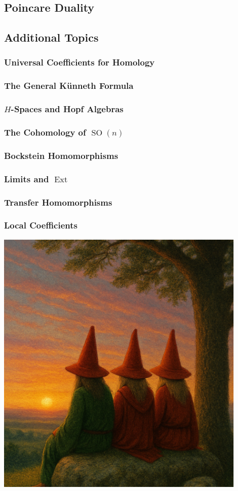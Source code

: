 \documentclass[11pt, a4paper, final]{amsart}
\DeclareMathOperator{\SO}{SO}
\DeclareMathOperator{\Ext}{Ext}
\numberwithin{theorem}{section}
\theoremstyle{definition}
\theoremstyle{remark}
\begin{document}
\subsection{Poincare Duality}
\subsection{Additional Topics}
\subsubsection{Universal Coefficients for Homology}
\subsubsection{The General K\"unneth Formula}
\subsubsection{$H$-Spaces and Hopf Algebras}
\subsubsection{The Cohomology of $\SO(n)$}
\subsubsection{Bockstein Homomorphisms}
\subsubsection{Limits and $\Ext$}
\subsubsection{Transfer Homomorphisms}
\subsubsection{Local Coefficients}

\printbibliography
\nocite{*}

\clearpage
\thispagestyle{empty}

\begin{center}
    \includegraphics[width=120mm]{images/happy_ending.png}
\end{center}
\end{document}
